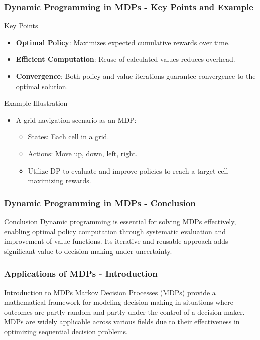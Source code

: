 \documentclass[aspectratio=169]{beamer}
\begin{document}
\begin{frame}[fragile]
    \frametitle{Dynamic Programming in MDPs - Key Points and Example}
    \begin{block}{Key Points}
        \begin{itemize}
            \item \textbf{Optimal Policy}: Maximizes expected cumulative rewards over time.
            \item \textbf{Efficient Computation}: Reuse of calculated values reduces overhead.
            \item \textbf{Convergence}: Both policy and value iterations guarantee convergence to the optimal solution.
        \end{itemize}
    \end{block}

    \begin{block}{Example Illustration}
        \begin{itemize}
            \item A grid navigation scenario as an MDP:
                \begin{itemize}
                    \item States: Each cell in a grid.
                    \item Actions: Move up, down, left, right.
                    \item Utilize DP to evaluate and improve policies to reach a target cell maximizing rewards.
                \end{itemize}
        \end{itemize}
    \end{block}
\end{frame}

\begin{frame}[fragile]
    \frametitle{Dynamic Programming in MDPs - Conclusion}
    \begin{block}{Conclusion}
        Dynamic programming is essential for solving MDPs effectively, enabling optimal policy computation through systematic evaluation and improvement of value functions. Its iterative and reusable approach adds significant value to decision-making under uncertainty.
    \end{block}
\end{frame}

\begin{frame}[fragile]
    \frametitle{Applications of MDPs - Introduction}
    \begin{block}{Introduction to MDPs}
        Markov Decision Processes (MDPs) provide a mathematical framework for modeling decision-making in situations where outcomes are partly random and partly under the control of a decision-maker. MDPs are widely applicable across various fields due to their effectiveness in optimizing sequential decision problems.
    \end{block}
\end{frame}
\end{document}
